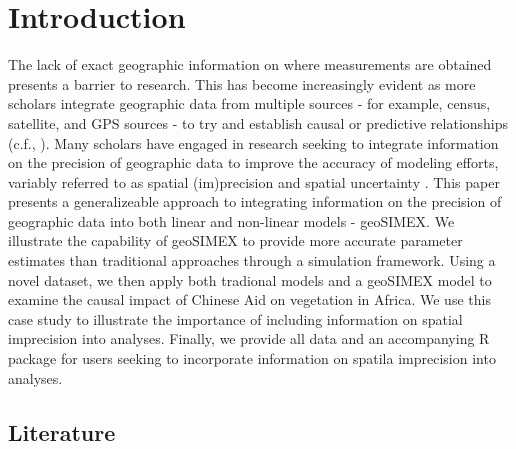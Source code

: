 \section{Introduction}
The lack of exact geographic information on where measurements are obtained presents a barrier to research.
This has become increasingly evident as more scholars integrate geographic data from multiple sources - for example, census, satellite, and GPS sources - to try and establish causal or predictive relationships (c.f., \cite{bare_assessing_2015,buntaine_titling_2015,gallo_mapping_2012,andam_measuring_2008}).
Many scholars have engaged in research seeking to integrate information on the precision of geographic data to improve the accuracy of modeling efforts, variably referred to as spatial (im)precision and spatial uncertainty \cite{worboys_imprecision_????,aerts_accounting_2003,ogryczak_efficient_2009}.
This paper presents a generalizeable approach to integrating information on the precision of geographic data into both linear and non-linear models - geoSIMEX.
We illustrate the capability of geoSIMEX to provide more accurate parameter estimates than traditional approaches through a simulation framework. 
Using a novel dataset, we then apply both tradional models and a geoSIMEX model to examine the causal impact of Chinese Aid on vegetation in Africa.
We use this case study to illustrate the importance of including information on spatial imprecision into analyses.
Finally, we provide all data and an accompanying R package for users seeking to incorporate information on spatila imprecision into analyses.

\subsection{Literature}

